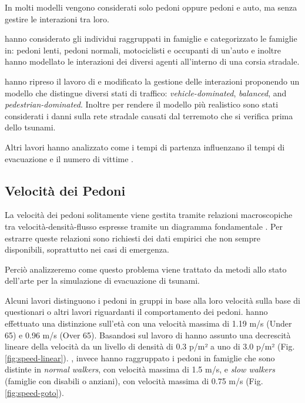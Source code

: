 



In molti modelli vengono considerati solo pedoni oppure pedoni e auto, ma senza gestire le interazioni tra loro.

\textcite{goto2012tsunami} hanno considerato gli individui raggruppati in famiglie e categorizzato le famiglie in:
pedoni lenti, pedoni normali, motociclisti e occupanti di un'auto e inoltre hanno
modellato le interazioni dei diversi agenti all'interno di una corsia stradale.

\textcite{wang2021novel} hanno ripreso il lavoro di \textcite{goto2012tsunami} e
modificato la gestione delle interazioni proponendo un modello che distingue diversi stati di traffico: \textit{vehicle-dominated}, \textit{balanced}, and \textit{pedestrian-dominated}. 
Inoltre per rendere il modello più realistico 
sono stati considerati i danni sulla rete stradale causati dal terremoto che si verifica prima dello tsunami.

Altri lavori hanno analizzato come i tempi di partenza influenzano il tempi di evacuazione e il numero di vittime
\parencite{wang2016agent, takabatake2017simulated}.


\subsection{Velocità dei Pedoni}
La velocità dei pedoni solitamente viene gestita tramite relazioni macroscopiche tra velocità-densità-flusso
espresse tramite un diagramma fondamentale \parencite{nikolic2016probabilistic}.
Per estrarre queste relazioni sono richiesti dei dati empirici che non sempre disponibili, soprattutto nei casi di emergenza.

Perciò analizzeremo come questo problema viene trattato da metodi allo stato dell'arte
per la simulazione di evacuazione di tsunami.

Alcuni lavori distinguono i pedoni in gruppi in base alla loro velocità sulla base di questionari o altri lavori riguardanti il comportamento dei pedoni.
\textcite{takabatake2017simulated} hanno effettuato una distinzione sull'età con una velocità massima di 1.19 m/s (Under 65) e 0.96 m/s (Over 65).
Basandosi sul lavoro di \textcite[]{older1968movement} hanno assunto una decrescità lineare della velocità da un livello di densità di 0.3 p/m² a uno di 3.0 p/m² (Fig. \ref{fig:speed-linear}).
\textcite{goto2012tsunami}, invece hanno raggruppato i pedoni in famiglie che sono distinte in \textit{normal walkers}, con velocità massima di 1.5 m/s, e
\textit{slow walkers} (famiglie con disabili o anziani), con velocità massima di 0.75 m/s (Fig. \ref{fig:speed-goto}).

